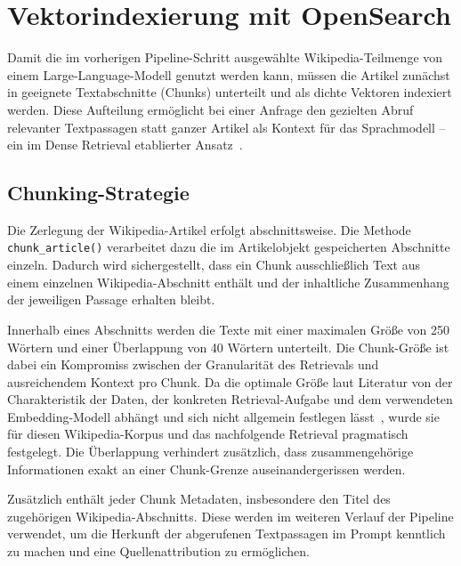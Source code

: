 \par\addvspace{1em}
\noindent\begin{minipage}[t]{\linewidth}
\vspace{0pt}
\chapter{Vektorindexierung mit OpenSearch}
\label{ch:indexierung}

Damit die im vorherigen Pipeline-Schritt ausgewählte Wikipedia-Teilmenge von einem Large-Language-Modell genutzt
werden kann, müssen die Artikel zunächst in geeignete Textabschnitte (Chunks) unterteilt und als dichte Vektoren
indexiert werden. Diese Aufteilung ermöglicht bei einer Anfrage den gezielten Abruf relevanter Textpassagen statt
ganzer Artikel als Kontext für das Sprachmodell -- ein im Dense Retrieval etablierter Ansatz~\cite{karpukhin-etal-2020-dense}.

\section{Chunking-Strategie}
\label{sec:chunking-strategie}

Die Zerlegung der Wikipedia-Artikel erfolgt abschnittsweise. Die Methode
\texttt{chunk\_article()} verarbeitet dazu die im Artikelobjekt gespeicherten
Abschnitte einzeln. Dadurch wird
sichergestellt, dass ein Chunk ausschließlich Text aus einem einzelnen Wikipedia-Abschnitt enthält und
der inhaltliche Zusammenhang der jeweiligen Passage erhalten bleibt.

Innerhalb eines Abschnitts werden die Texte mit einer maximalen Größe von 250 Wörtern und einer
Überlappung von 40 Wörtern unterteilt. Die Chunk-Größe ist dabei ein Kompromiss zwischen der Granularität
des Retrievals und ausreichendem Kontext pro Chunk. Da die optimale Größe laut Literatur von der
Charakteristik der Daten, der konkreten Retrieval-Aufgabe und dem verwendeten Embedding-Modell abhängt und
sich nicht allgemein festlegen lässt~\cite{bhat2025rethinkingchunksizelongdocument}, wurde sie für diesen
Wikipedia-Korpus und das nachfolgende Retrieval pragmatisch festgelegt. Die Überlappung verhindert
zusätzlich, dass zusammengehörige Informationen exakt an einer Chunk-Grenze auseinandergerissen werden.

Zusätzlich enthält jeder Chunk Metadaten, insbesondere den Titel des
zugehörigen Wikipedia-Abschnitts. Diese werden im weiteren Verlauf der Pipeline verwendet, um die Herkunft
der abgerufenen Textpassagen im Prompt kenntlich zu machen und eine Quellenattribution zu ermöglichen.


\end{minipage}\par\addvspace{1em}

